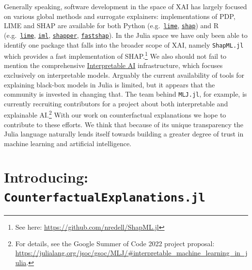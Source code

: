 \documentclass{juliacon}
\begin{document}
Generally speaking, software development in the space of XAI has largely
focused on various global methods and surrogate explainers:
implementations of PDP, LIME and SHAP are available for both Python
(e.g.~\href{https://github.com/marcotcr/lime}{\texttt{lime}},
\href{https://github.com/slundberg/shap}{\texttt{shap}}) and R
(e.g.~\href{https://cran.r-project.org/web/packages/lime/index.html}{\texttt{lime}},
\href{https://cran.r-project.org/web/packages/lime/index.html}{\texttt{iml}},
\href{https://modeloriented.github.io/shapper/}{\texttt{shapper}},
\href{https://github.com/bgreenwell/fastshap}{\texttt{fastshap}}). In
the Julia space we have only been able to identify one package that
falls into the broader scope of XAI, namely \texttt{ShapML.jl} which
provides a fast implementation of SHAP.\footnote{See here:
  \url{https://github.com/nredell/ShapML.jl}} We also should not fail to
mention the comprehensive
\href{https://docs.interpretable.ai/stable/IAIBase/data/}{Interpretable
AI} infrastructure, which focuses exclusively on interpretable models.
Arguably the current availability of tools for explaining black-box
models in Julia is limited, but it appears that the community is
invested in changing that. The team behind \texttt{MLJ.jl}, for example,
is currently recruiting contributors for a project about both
interpretable and explainable AI.\footnote{For details, see the Google
  Summer of Code 2022 project proposal:
  \url{https://julialang.org/jsoc/gsoc/MLJ/\#interpretable_machine_learning_in_julia}.}
With our work on counterfactual explanations we hope to contribute to
these efforts. We think that because of its unique transparency the
Julia language naturally lends itself towards building a greater degree
of trust in machine learning and artificial intelligence.

\hypertarget{sec-use}{%
\section{\texorpdfstring{Introducing:
\texttt{CounterfactualExplanations.jl}}{Introducing: CounterfactualExplanations.jl}}\label{sec-use}}
\end{document}
